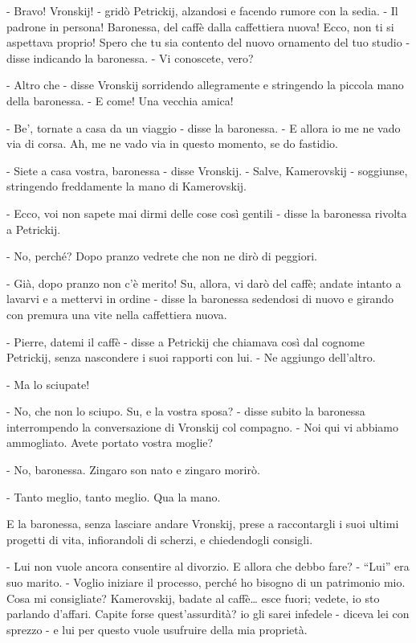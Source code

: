 - Bravo! Vronskij! - gridò Petrickij, alzandosi e facendo rumore con la sedia. - Il padrone in persona! Baronessa, del caffè dalla caffettiera nuova! Ecco, non ti si aspettava proprio! Spero che tu sia contento del nuovo ornamento del tuo studio - disse indicando la baronessa. - Vi conoscete, vero? 

- Altro che - disse Vronskij sorridendo allegramente e stringendo la piccola mano della baronessa. - E come! Una vecchia amica! 

- Be', tornate a casa da un viaggio - disse la baronessa. - E allora io me ne vado via di corsa. Ah, me ne vado via in questo momento, se do fastidio. 

- Siete a casa vostra, baronessa - disse Vronskij. - Salve, Kamerovskij - soggiunse, stringendo freddamente la mano di Kamerovskij. 

- Ecco, voi non sapete mai dirmi delle cose così gentili - disse la baronessa rivolta a Petrickij. 

- No, perché? Dopo pranzo vedrete che non ne dirò di peggiori. 

- Già, dopo pranzo non c'è merito! Su, allora, vi darò del caffè; andate intanto a lavarvi e a mettervi in ordine - disse la baronessa sedendosi di nuovo e girando con premura una vite nella caffettiera nuova. 

- Pierre, datemi il caffè - disse a Petrickij che chiamava così dal cognome Petrickij, senza nascondere i suoi rapporti con lui. - Ne aggiungo dell'altro. 

- Ma lo sciupate! 

- No, che non lo sciupo. Su, e la vostra sposa? - disse subito la baronessa interrompendo la conversazione di Vronskij col compagno. - Noi qui vi abbiamo ammogliato. Avete portato vostra moglie? 

- No, baronessa. Zingaro son nato e zingaro morirò. 

- Tanto meglio, tanto meglio. Qua la mano. 

E la baronessa, senza lasciare andare Vronskij, prese a raccontargli i suoi ultimi progetti di vita, infiorandoli di scherzi, e chiedendogli consigli. 

- Lui non vuole ancora consentire al divorzio. E allora che debbo fare? - ``Lui'' era suo marito. - Voglio iniziare il processo, perché ho bisogno di un patrimonio mio. Cosa mi consigliate? Kamerovskij, badate al caffè\ldots{} esce fuori; vedete, io sto parlando d'affari. Capite forse quest'assurdità? io gli sarei infedele - diceva lei con sprezzo - e lui per questo vuole usufruire della mia proprietà. 

